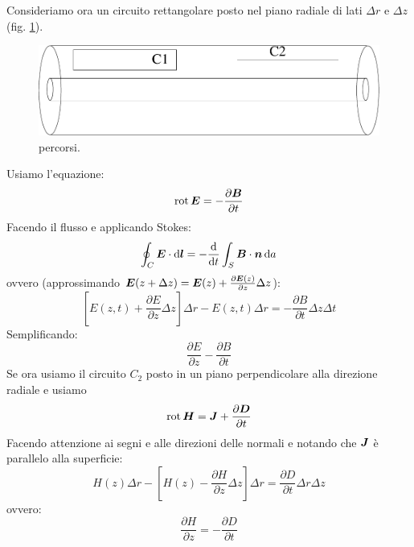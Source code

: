 Consideriamo ora un circuito rettangolare posto nel piano radiale di lati $\Delta r$ e $\Delta z$ (fig. \ref{coassiali_03}).
\begin{figure}[htbp]
  \centering
  \includegraphics[scale=0.5]{immagini/fisica2/coassiali_03}
  \caption{percorsi.}
  \label{coassiali_03}
\end{figure}
Usiamo l'equazione:
\begin{equation}
  \operatorname{rot}\boldsymbol{E}=-\frac{\partial\boldsymbol{B}}{\partial t}
\end{equation}
Facendo il flusso e applicando Stokes:
\begin{equation}
  \oint_{C}\boldsymbol{E}\cdot\mathrm{d} \boldsymbol{l}=-\frac{\mathrm{d}}{\mathrm{d} t}\int_{S}\boldsymbol{B}\cdot\boldsymbol{n}\,\mathrm{d} a
\end{equation}
ovvero (approssimando $\boldsymbol{E}(z+\Delta z)=\boldsymbol{E}(z)+\frac{\partial\boldsymbol{E}(z)}{\partial z}\Delta z$):
\begin{equation}
  \left[E(z,t)+\frac{\partial E}{\partial z}\Delta z\right]\Delta r-E(z,t)\Delta r=-\frac{\partial B}{\partial t}\Delta z\Delta t
\end{equation}
Semplificando:
\begin{equation}
  \frac{\partial E}{\partial z}-\frac{\partial B}{\partial t}
  \label{coa_dif1}
\end{equation}
Se ora usiamo il circuito $C_2$ posto in un piano perpendicolare alla direzione radiale e usiamo
\begin{equation}
  \operatorname{rot} \boldsymbol{H}=\boldsymbol{J}+\frac{\partial \boldsymbol{D}}{\partial t}
\end{equation}
Facendo attenzione ai segni e alle direzioni delle normali e notando che $\boldsymbol{J}$ è parallelo alla superficie:
\begin{equation}
  H(z)\Delta r-\left[H(z)-\frac{\partial H}{\partial z}\Delta z\right]\Delta r=\frac{\partial D}{\partial t}\Delta r\Delta z
\end{equation}
ovvero:
\begin{equation}
  \frac{\partial H}{\partial z}=-\frac{\partial D}{\partial t}
  \label{coa_dif2}
\end{equation}

